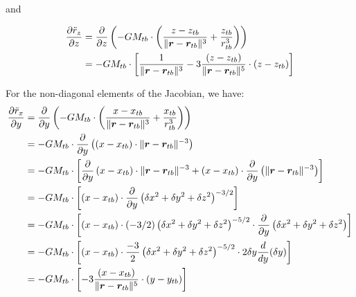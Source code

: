 and

\begin{equation}\label{eq:thirdbodyaccelerationgradz}
  \begin{aligned}
  \frac{\partial \ddot{r}_z}{\partial z} &= \frac{\partial}{\partial z}\left( -GM_{tb} \cdot \left( \frac{z - z_{tb}}{\lVert\bm{r}-\bm{r}_{tb}\rVert^3} + \frac{z_{tb}}{r_{tb}^3} \right) \right) \\
    &= -GM_{tb} \cdot \left[ \frac{1}{\lVert\bm{r}-\bm{r}_{tb}\rVert^{3}} - 3 \frac{\left(z - z_{tb}\right)}{\lVert\bm{r}-\bm{r}_{tb}\rVert^{5}} \cdot \left(z - z_{tb}\right) \right]
  \end{aligned}
\end{equation}

For the non-diagonal elements of the Jacobian, we have:
\begin{equation}\label{eq:thirdbodyaccelerationgradxy}
  \begin{aligned}
  \frac{\partial \ddot{r}_x}{\partial y}
  &= \frac{\partial}{\partial y}\left( -GM_{tb} \cdot \left( \frac{x - x_{tb}}{\lVert\bm{r}-\bm{r}_{tb}\rVert^3} + \frac{x_{tb}}{r_{tb}^3} \right) \right) \\
  &= -GM_{tb} \cdot \frac{\partial}{\partial y} \left( \left(x - x_{tb}\right) \cdot \lVert\bm{r}-\bm{r}_{tb}\rVert^{-3} \right) \\
  &= -GM_{tb} \cdot \left[ \frac{\partial}{\partial y} \left(x - x_{tb}\right) \cdot \lVert\bm{r}-\bm{r}_{tb}\rVert^{-3} 
    + \left(x - x_{tb}\right) \cdot \frac{\partial}{\partial y} \left( \lVert\bm{r}-\bm{r}_{tb}\rVert^{-3} \right) \right] \\
  &= -GM_{tb} \cdot \left[ \left(x - x_{tb}\right) \cdot \frac{\partial}{\partial y} \left( \delta x^2 + \delta y^2 + \delta z^2 \right)^{-3/2} \right] \\
  &= -GM_{tb} \cdot \left[ \left(x - x_{tb}\right) \cdot (-3/2) \left( \delta x^2 + \delta y^2 + \delta z^2 \right)^{-5/2}
    \cdot \frac{\partial}{\partial y} \left( \delta x^2 + \delta y^2 + \delta z^2 \right) \right] \\
  &= -GM_{tb} \cdot \left[ \left(x - x_{tb}\right) \cdot \frac{-3}{2} \left( \delta x^2 + \delta y^2 + \delta z^2 \right)^{-5/2} \cdot 2 \delta y \frac{d}{dy} (\delta y) \right] \\
  &= -GM_{tb} \cdot \left[ - 3 \frac{\left(x - x_{tb}\right)}{\lVert\bm{r}-\bm{r}_{tb}\rVert^{5}} \cdot \left(y - y_{tb}\right) \right] \\
  \end{aligned}
\end{equation}

